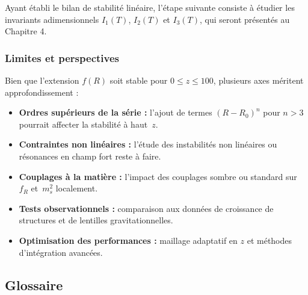 Ayant établi le bilan de stabilité linéaire, l’étape suivante consiste à étudier
les invariants adimensionnels $I_{1}(T)$, $I_{2}(T)$ et $I_{3}(T)$, qui
seront présentés au Chapitre 4.

\subsubsection*{Limites et perspectives}

Bien que l’extension $f(R)$ soit stable pour $0\le z\le100$, plusieurs axes
méritent approfondissement :

\begin{itemize}
  \item \textbf{Ordres supérieurs de la série :}
    l’ajout de termes $(R-R_{0})^n$ pour $n>3$ pourrait affecter la stabilité à haut~$z$.
  \item \textbf{Contraintes non linéaires :}
    l’étude des instabilités non linéaires ou résonances en champ fort reste à faire.
  \item \textbf{Couplages à la matière :}
    l’impact des couplages sombre ou standard sur $f_R$ et~$m_s^2$ localement.
  \item \textbf{Tests observationnels :}
    comparaison aux données de croissance de structures et de lentilles gravitationnelles.
  \item \textbf{Optimisation des performances :}
    maillage adaptatif en $z$ et méthodes d’intégration avancées.
\end{itemize}

\subsection*{Glossaire}

